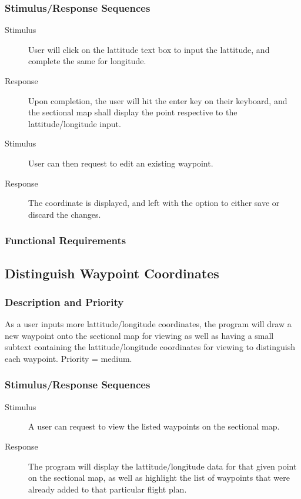 \documentclass[12pt, letterpaper]{article}
\begin{document}
    \subsubsection{Stimulus/Response Sequences}
      \begin{description}
        \item[Stimulus] User will click on the lattitude text box to input the 
			lattitude, and complete the same for longitude.
		\item[Response] Upon completion, the user will hit the enter key on their
			keyboard, and the sectional map shall display the point respective
			to the lattitude/longitude input.
		\item[Stimulus] User can then request to edit an existing waypoint.
		\item[Response] The coordinate is displayed, and left with the option to
			either save or discard the changes.
      \end{description}
    \subsubsection{Functional Requirements}

    \subsection{Distinguish Waypoint Coordinates}
      \subsubsection{Description and Priority}
		As a user inputs more lattitude/longitude coordinates, the program will
	    draw a new waypoint onto the sectional map for viewing as well 
		as having a small subtext containing the lattitude/longitude coordinates 
		for viewing to distinguish each waypoint. Priority = medium.
      \subsubsection{Stimulus/Response Sequences}
        \begin{description}
          \item[Stimulus] A user can request to view the listed waypoints on the
			sectional map.
		  \item[Response] The program will display the lattitude/longitude data
			for that given point on the sectional map, as well as highlight the
			list of waypoints that were already added to that particular flight
			plan.
        \end{description}
\end{document}
